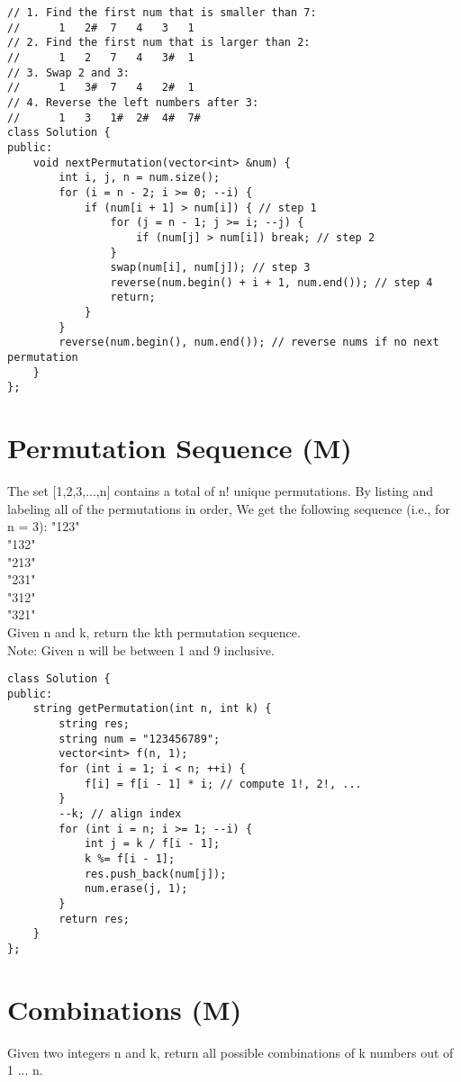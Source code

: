 \begin{lstlisting}
// 1. Find the first num that is smaller than 7:
//      1   2#  7   4   3   1
// 2. Find the first num that is larger than 2:
//      1   2   7   4   3#  1
// 3. Swap 2 and 3:
//      1   3#  7   4   2#  1
// 4. Reverse the left numbers after 3: 
//      1   3   1#  2#  4#  7#
class Solution {
public:
    void nextPermutation(vector<int> &num) {
        int i, j, n = num.size();
        for (i = n - 2; i >= 0; --i) {
            if (num[i + 1] > num[i]) { // step 1
                for (j = n - 1; j >= i; --j) {
                    if (num[j] > num[i]) break; // step 2
                }
                swap(num[i], num[j]); // step 3
                reverse(num.begin() + i + 1, num.end()); // step 4
                return;
            }
        }
        reverse(num.begin(), num.end()); // reverse nums if no next permutation
    }
};
\end{lstlisting}


\section{Permutation Sequence (M)}
The set [1,2,3,...,n] contains a total of n! unique permutations. By listing and labeling all of the permutations in order, We get the following sequence (i.e., for n = 3):
    "123"\\
    "132"\\
    "213"\\
    "231"\\
    "312"\\
    "321"\\
Given n and k, return the kth permutation sequence.\\
Note: Given n will be between 1 and 9 inclusive.\\

\begin{lstlisting}
class Solution {
public:
    string getPermutation(int n, int k) {
        string res;
        string num = "123456789";
        vector<int> f(n, 1);
        for (int i = 1; i < n; ++i) {
            f[i] = f[i - 1] * i; // compute 1!, 2!, ...
        }
        --k; // align index
        for (int i = n; i >= 1; --i) {
            int j = k / f[i - 1];
            k %= f[i - 1];
            res.push_back(num[j]);
            num.erase(j, 1);
        }
        return res;
    }
};
\end{lstlisting}


\section{Combinations (M)}
Given two integers n and k, return all possible combinations of k numbers out of 1 ... n.\\

